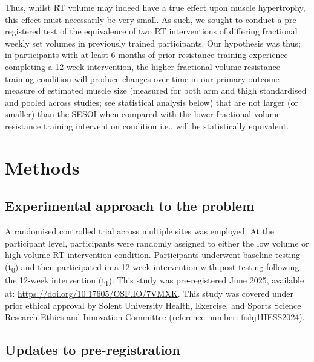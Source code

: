 \documentclass[
]{article}
\begin{document}
Thus, whilst RT volume may indeed have a true effect upon muscle
hypertrophy, this effect must necessarily be very small. As such, we
sought to conduct a pre-registered test of the equivalence of two RT
interventions of differing fractional weekly set volumes in previously
trained participants. Our hypothesis was thus; in participants with at
least 6 months of prior resistance training experience completing a 12
week intervention, the higher fractional volume resistance training
condition will produce changes over time in our primary outcome measure
of estimated muscle size (measured for both arm and thigh standardised
and pooled across studies; see statistical analysis below) that are not
larger (or smaller) than the SESOI when compared with the lower
fractional volume resistance training intervention condition i.e., will
be statistically equivalent.

\section{Methods}\label{methods}

\subsection{Experimental approach to the
problem}\label{experimental-approach-to-the-problem}

A randomised controlled trial across multiple sites was employed. At the
participant level, participants were randomly assigned to either the low
volume or high volume RT intervention condition. Participants underwent
baseline testing (t\textsubscript{0}) and then participated in a 12-week
intervention with post testing following the 12-week intervention
(t\textsubscript{1}). This study was pre-registered June 2025, available
at: \url{https://doi.org/10.17605/OSF.IO/7VMXK}. This study was covered
under prior ethical approval by Solent University Health, Exercise, and
Sports Science Research Ethics and Innovation Committee (reference
number: fishj1HESS2024).

\subsection{Updates to
pre-registration}\label{updates-to-pre-registration}
\end{document}
